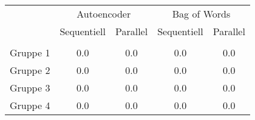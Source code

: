 \begin{center}
    \begin{tabular}{l c c c c}
     		 & \multicolumn{2}{c}{Autoencoder} & \multicolumn{2}{c}{Bag of Words}  \\
    	     & Sequentiell & Parallel 	& Sequentiell  & Parallel  		\\ \hline
    	     															\\[-0.9em] 
    Gruppe 1 & 0.0		   & 0.0		& 0.0		   & 0.0			\\     
    Gruppe 2 & 0.0		   & 0.0		& 0.0		   & 0.0			\\ 
    Gruppe 3 & 0.0		   & 0.0	 	& 0.0		   & 0.0			\\ 
    Gruppe 4 & 0.0		   & 0.0		& 0.0		   & 0.0			\\
    \end{tabular}
\end{center}